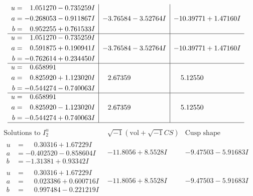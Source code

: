 \documentclass[1p]{elsarticle_modified}
\theoremstyle{definition}
\newcommand{\I}{\sqrt{-1}}
\begin{document}
$$\begin{array}{c|c|c}
\begin{aligned}
u &= \phantom{-}1.051270 - 0.735259 I \\
a &= -0.268053 - 0.911867 I \\
b &= \phantom{-}0.952255 + 0.761533 I\end{aligned}
 & -3.76584 - 3.52764 I & -10.39771 + 1.47160 I \\ \hline\begin{aligned}
u &= \phantom{-}1.051270 - 0.735259 I \\
a &= \phantom{-}0.591875 + 0.190941 I \\
b &= -0.762614 + 0.234450 I\end{aligned}
 & -3.76584 - 3.52764 I & -10.39771 + 1.47160 I \\ \hline\begin{aligned}
u &= \phantom{-}0.658991\phantom{ +0.000000I} \\
a &= \phantom{-}0.825920 + 1.123020 I \\
b &= -0.544274 - 0.740063 I\end{aligned}
 & \phantom{-}2.67359\phantom{ +0.000000I} & \phantom{-}5.12550\phantom{ +0.000000I} \\ \hline\begin{aligned}
u &= \phantom{-}0.658991\phantom{ +0.000000I} \\
a &= \phantom{-}0.825920 - 1.123020 I \\
b &= -0.544274 + 0.740063 I\end{aligned}
 & \phantom{-}2.67359\phantom{ +0.000000I} & \phantom{-}5.12550\phantom{ +0.000000I}\\
 \hline 
 \end{array}$$\newpage$$\begin{array}{c|c|c}  
\text{Solutions to }I^u_{2}& \I (\text{vol} + \sqrt{-1}CS) & \text{Cusp shape}\\
 \hline 
\begin{aligned}
u &= \phantom{-}0.30316 + 1.67229 I \\
a &= -0.402520 - 0.858604 I \\
b &= -1.31381 + 0.93342 I\end{aligned}
 & -11.8056 + 8.5528 I & -9.47503 - 5.91683 I \\ \hline\begin{aligned}
u &= \phantom{-}0.30316 + 1.67229 I \\
a &= \phantom{-}0.023386 + 0.600716 I \\
b &= \phantom{-}0.997484 - 0.221219 I\end{aligned}
 & -11.8056 + 8.5528 I & -9.47503 - 5.91683 I \\ \hline\begin{aligned}

\end{aligned}
\end{array}$$
\end{document}
